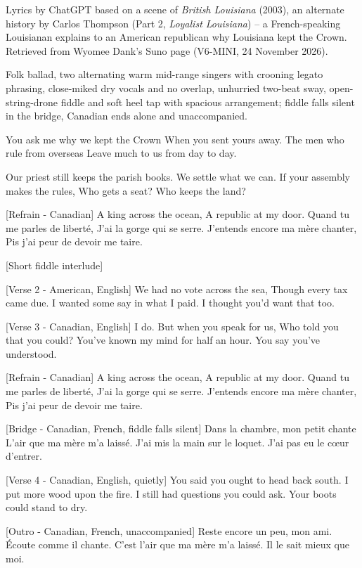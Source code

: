 
\begin{notes}
Lyrics by ChatGPT based on a scene of \emph{British Louisiana} (2003), an alternate history by Carlos Thompson (Part 2, \emph{Loyalist Louisiana}) -- a French-speaking Louisianan explains to an American republican why Louisiana kept the Crown. Retrieved from Wyomee Dank's Suno page (V6-MINI, 24 November 2026).
\end{notes}
\begin{style}
Folk ballad, two alternating warm mid-range singers with crooning legato phrasing, close-miked dry vocals and no overlap, unhurried two-beat sway, open-string-drone fiddle and soft heel tap with spacious arrangement; fiddle falls silent in the bridge, Canadian ends alone and unaccompanied.
\end{style}
\begin{lyrics}
You ask me why we kept the Crown
When you sent yours away.
The men who rule from overseas
Leave much to us from day to day.

Our priest still keeps the parish books.
We settle what we can.
If your assembly makes the rules,
Who gets a seat? Who keeps the land?

[Refrain - Canadian]
A king across the ocean,
A republic at my door.
Quand tu me parles de liberté,
J’ai la gorge qui se serre.
J’entends encore ma mère chanter,
Pis j’ai peur de devoir me taire.

[Short fiddle interlude]

[Verse 2 - American, English]
We had no vote across the sea,
Though every tax came due.
I wanted some say in what I paid.
I thought you’d want that too.

[Verse 3 - Canadian, English]
I do. But when you speak for us,
Who told you that you could?
You’ve known my mind for half an hour.
You say you’ve understood.

[Refrain - Canadian]
A king across the ocean,
A republic at my door.
Quand tu me parles de liberté,
J’ai la gorge qui se serre.
J’entends encore ma mère chanter,
Pis j’ai peur de devoir me taire.

[Bridge - Canadian, French, fiddle falls silent]
Dans la chambre, mon petit chante
L’air que ma mère m’a laissé.
J’ai mis la main sur le loquet.
J’ai pas eu le cœur d’entrer.

[Verse 4 - Canadian, English, quietly]
You said you ought to head back south.
I put more wood upon the fire.
I still had questions you could ask.
Your boots could stand to dry.

[Outro - Canadian, French, unaccompanied]
Reste encore un peu, mon ami.
Écoute comme il chante.
C’est l’air que ma mère m’a laissé.
Il le sait mieux que moi.
\end{lyrics}

